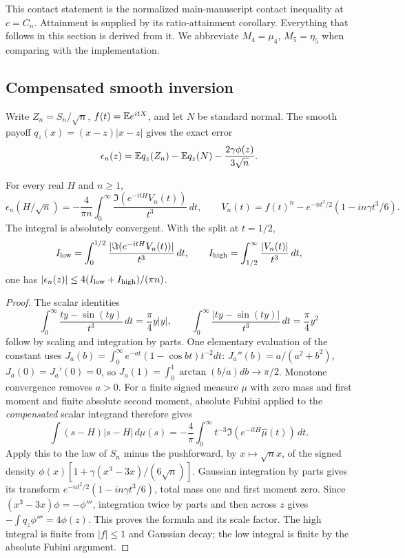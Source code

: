 This contact statement is the normalized main-manuscript contact inequality at $c=C_n$. Attainment is supplied by its ratio-attainment corollary.
Everything that follows in this section is derived from it. We abbreviate
$M_4=\mu_4$, $M_5=\eta_5$ when comparing with the implementation.
\subsection{Compensated smooth inversion}
Write $Z_n=S_n/\sqrt n$, $f(t)=\mathbb E e^{itX}$, and let $N$ be standard normal.
The smooth payoff $q_z(x)=(x-z)|x-z|$ gives the exact error
\[
 \epsilon_n(z)=\mathbb E q_z(Z_n)-\mathbb E q_z(N)-\frac{2\gamma\phi(z)}{3\sqrt n}.
\]
\begin{lemma}\label{smooth:fourier}\label{smooth:inversion}
For every real $H$ and $n\ge1$,
\begin{equation}\label{smooth:smooth-integral}
 \epsilon_n(H/\sqrt n)=-\frac4{\pi n}\int_0^\infty
 \frac{\Im(e^{-itH}V_n(t))}{t^3}\,dt,\qquad
 V_n(t)=f(t)^n-e^{-nt^2/2}(1-in\gamma t^3/6).
\end{equation}
The integral is absolutely convergent. With the split at $t=1/2$,
\begin{equation}\label{smooth:split}
 I_{\rm low}=\int_0^{1/2}\frac{|\Im(e^{-itH}V_n(t))|}{t^3}\,dt,
 \qquad I_{\rm high}=\int_{1/2}^\infty\frac{|V_n(t)|}{t^3}\,dt,
\end{equation}
one has $|\epsilon_n(z)|\le4(I_{\rm low}+I_{\rm high})/(\pi n)$.
\end{lemma}
\begin{proof}
The scalar identities
\[
 \int_0^\infty\frac{ty-\sin(ty)}{t^3}\,dt=\frac\pi4y|y|,
 \qquad
 \int_0^\infty\frac{|ty-\sin(ty)|}{t^3}\,dt=\frac\pi4y^2
\]
follow by scaling and integration by parts. One elementary evaluation of
the constant uses
$J_a(b)=\int_0^\infty e^{-at}(1-\cos bt)t^{-2}dt$:
$J_a''(b)=a/(a^2+b^2)$, $J_a(0)=J_a'(0)=0$, so
$J_a(1)=\int_0^1\arctan(b/a)db\to\pi/2$.
Monotone convergence removes $a>0$.
For a finite signed measure $\mu$ with zero mass and first moment and
finite absolute second moment, absolute Fubini applied to the
\emph{compensated} scalar integrand therefore gives
\begin{equation}\label{smooth:signed-inversion}
 \int (s-H)|s-H|\,d\mu(s)
 =-\frac4\pi\int_0^\infty t^{-3}
       \Im(e^{-itH}\widehat\mu(t))\,dt.
\end{equation}
Apply this to the law of $S_n$ minus the pushforward, by $x\mapsto\sqrt n x$,
of the signed density
$\phi(x)[1+\gamma(x^3-3x)/(6\sqrt n)]$.
Gaussian integration by parts gives its transform
$e^{-nt^2/2}(1-in\gamma t^3/6)$, total mass one and first moment zero.
Since $(x^3-3x)\phi=-\phi'''$, integration twice by parts and then across
$z$ gives $-\int q_z\phi'''=4\phi(z)$. This proves the formula and its
scale factor. The high integral is finite from $|f|\le1$ and Gaussian
decay; the low integral is finite by the absolute Fubini argument.
\end{proof}


